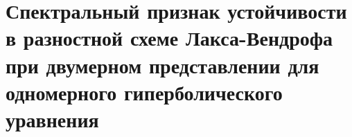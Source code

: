 \documentclass[__main__.tex]{subfiles}
\begin{document}
\section{Спектральный признак устойчивости в разностной схеме Лакса-Вендрофа при двумерном представлении для одномерного гиперболического уравнения}
\end{document}
